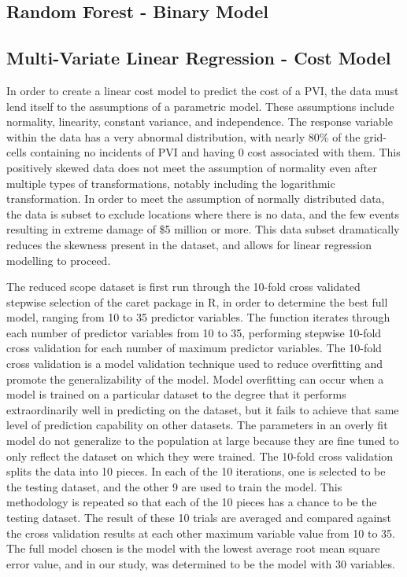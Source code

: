 \documentclass{llncs}
\begin{document}
\subsection{Random Forest - Binary Model}

\subsection{Multi-Variate Linear Regression - Cost Model}
In order to create a linear cost model to predict the cost of a PVI, the data must lend itself to the assumptions of a parametric model. These assumptions include normality, linearity, constant variance, and independence. The response variable within the data has a very abnormal distribution, with nearly 80\% of the grid-cells containing no incidents of PVI and having 0 cost associated with them. This positively skewed data does not meet the assumption of normality even after multiple types of transformations, notably including the logarithmic transformation. In order to meet the assumption of normally distributed data, the data is subset to exclude locations where there is no data, and the few events resulting in extreme damage of \$5 million or more. This data subset dramatically reduces the skewness present in the dataset, and allows for linear regression modelling to proceed.

The reduced scope dataset is first run through the 10-fold cross validated stepwise selection of the caret package in R, in order to determine the best full model, ranging from 10 to 35 predictor variables. The function iterates through each number of predictor variables from 10 to 35, performing stepwise 10-fold cross validation for each number of maximum predictor variables. The 10-fold cross validation is a model validation technique used to reduce overfitting and promote the generalizability of the model. Model overfitting can occur when a model is trained on a particular dataset to the degree that it performs extraordinarily well in predicting on the dataset, but it fails to achieve that same level of prediction capability on other datasets. The parameters in an overly fit model do not generalize to the population at large because they are fine tuned to only reflect the dataset on which they were trained. The 10-fold cross validation splits the data into 10 pieces. In each of the 10 iterations, one is selected to be the testing dataset, and the other 9 are used to train the model. This methodology is repeated so that each of the 10 pieces has a chance to be the testing dataset. The result of these 10 trials are averaged and compared against the cross validation results at each other maximum variable value from 10 to 35. The full model chosen is the model with the lowest average root mean square error value, and in our study, was determined to be the model with 30 variables.
\end{document}
